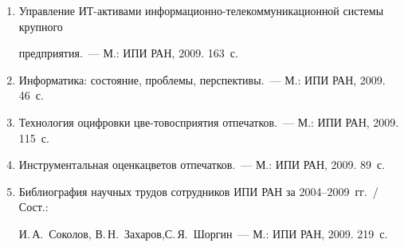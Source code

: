 \begin{enumerate}[1.]


\item {}


Управление ИТ-ак\-ти\-ва\-ми ин\-фор\-ма\-ци\-он\-но-те\-лекоммуникационной системы круп\-но\-го


предприятия.~--- М.: ИПИ РАН, 2009. 163~с.





\item {}


Информатика: состояние, проб\-ле\-мы, перспективы.~--- М.: ИПИ РАН, 2009.  46~с.





\item {}


Технология оцифровки цве-\linebreak товосприятия отпечатков.~--- М.: ИПИ РАН, 2009. 115~с.





\item {} 


Инструментальная оценка\linebreak цветов отпечатков.~--- М.: ИПИ РАН, 2009.  89~с.





\item 


Библиография научных трудов сотрудников ИПИ РАН за 2004--2009~гг.~/ Сост.: 


И.\,А.~Соколов, В.\,Н.~Захаров,\linebreak С.\,Я.~Шоргин~--- М.: ИПИ РАН, 2009.  219~с. 






\end{enumerate}
